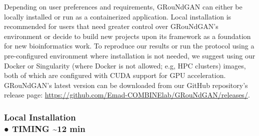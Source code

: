 Depending on user preferences and requirements, GRouNdGAN can either be locally installed or
run as a containerized application. Local installation is recommended for users that need greater
control over GRouNdGAN’s environment or decide to build new projects upon its framework as
a foundation for new bioinformatics work. To reproduce our results or run the protocol using a
pre-configured environment where installation is not needed, we suggest using our Docker or
Singularity (where Docker is not allowed; e.g, HPC clusters) images, both of which are configured
with CUDA support for GPU acceleration. GRouNdGAN’s latest version can be downloaded from
our GitHub repository’s release page: \url{https://github.com/Emad-COMBINElab/GRouNdGAN/releases/}.

\subsubsection*{Local Installation \\ ● TIMING \textasciitilde 12 min}

